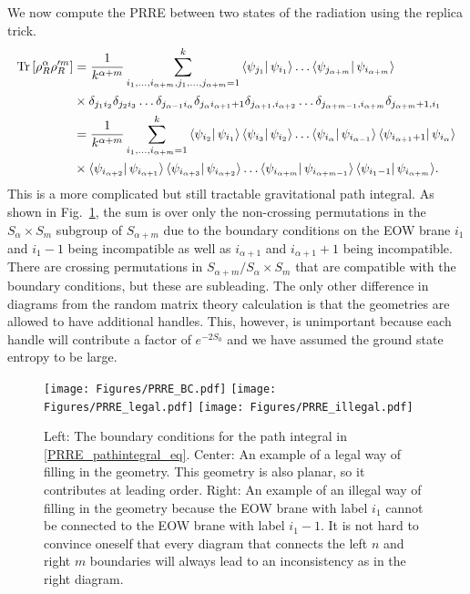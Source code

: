 \documentclass[a4paper,11pt]{article}
\newcommand{\Tr}{\text{Tr}}
\begin{document}
We now compute the PRRE between two states of the radiation using the replica trick.
\begin{align}
    \Tr \left[\rho_R^{\alpha} \rho_R'^m\right] &= \frac{1}{k^{{\alpha}+m}}
    \sum_{i_1,\dots, i_{{\alpha}+m},j_1, \dots, j_{{\alpha}+m} = 1}^k\bra{\psi_{j_1}}\psi_{i_1}\rangle \dots \bra{\psi_{j_{{\alpha}+m}}}\psi_{i_{{\alpha}+m}}\rangle
    \nonumber
    \\
    &\times \delta_{j_1 i_2} \delta_{j_2 i_3} \dots \delta_{j_{{\alpha}-1}i_{\alpha}}\delta_{j_{\alpha} i_{{\alpha}+1}+1}\delta_{j_{{\alpha}+1},i_{{\alpha}+2}}\dots \delta_{j_{{\alpha}+m-1},i_{{\alpha}+m}}\delta_{j_{{\alpha}+m}+1,i_1}
    \nonumber
    \\
    &= \frac{1}{k^{{\alpha}+m}}\sum_{i_1,\dots, i_{{\alpha}+m}= 1}^k\bra{\psi_{i_2}}\psi_{i_1}\rangle\bra{\psi_{i_3}}\psi_{i_2}\rangle \dots\bra{\psi_{i_{{\alpha}}}}\psi_{i_{{\alpha}-1}}\rangle\bra{\psi_{i_{{\alpha}+1}+1}}
    \psi_{i_{{\alpha}}}\rangle
    \nonumber
    \\
    &\times \bra{\psi_{i_{{\alpha}+2}}}\psi_{i_{{\alpha}+1}}\rangle \bra{\psi_{i_{{\alpha}+3}}}\psi_{i_{{\alpha}+2}}\rangle\dots  \bra{\psi_{i_{{\alpha}+m}}}\psi_{i_{{\alpha}+m-1}}\rangle
     \bra{\psi_{i_{1}-1}}\psi_{i_{{\alpha}+m}}\rangle.
     \label{PRRE_pathintegral_eq}
\end{align}
This is a more complicated but still tractable gravitational path integral. As shown in Fig.~\ref{PREE_replica_wormhole}, the sum is over only the non-crossing permutations in the $S_{\alpha} \times S_m$ subgroup of $S_{{\alpha}+m}$ due to the boundary conditions on the EOW brane $i_1$ and $i_1 -1$ being incompatible as well as $i_{{\alpha}+1}$ and $i_{{\alpha}+1}+1$ being incompatible. There are crossing permutations in $S_{\alpha +m}/S_{\alpha}\times S_m$ that are compatible with the boundary conditions, but these are subleading. The only other difference in diagrams from the random matrix theory calculation is that the geometries are allowed to have additional handles. This, however, is unimportant because each handle will contribute a factor of $e^{-2 S_0}$ and we have assumed the ground state entropy to be large. 

\begin{figure}
    \centering
    \texttt{[image: Figures/PRRE\_BC.pdf]}
    \texttt{[image: Figures/PRRE\_legal.pdf]}
    \texttt{[image: Figures/PRRE\_illegal.pdf]}
    \caption{Left: The boundary conditions for the path integral in \eqref{PRRE_pathintegral_eq}. Center: An example of a legal way of filling in the geometry. This geometry is also planar, so it contributes at leading order. Right: An example of an illegal way of filling in the geometry because the EOW brane with label $i_1$ cannot be connected to the EOW brane with label $i_1 -1$. It is not hard to convince oneself that every diagram that connects the left $n$ and right $m$ boundaries will always lead to an inconsistency as in the right diagram.}
    \label{PREE_replica_wormhole}
\end{figure}
\end{document}

